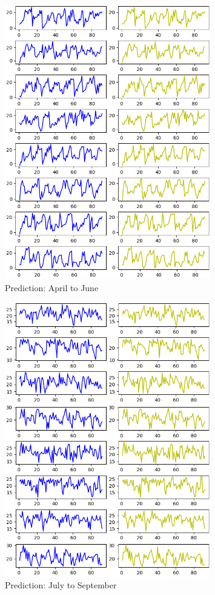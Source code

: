 \documentclass[12pt]{article}
\begin{document}
\begin{figure}[htpb]
	\centering
	\includegraphics[width=0.8\textwidth]{pic/Predicted-and-Tested_2.png}
	\caption{Prediction: April to June}
	\label{Fig:pred-2}
\end{figure}

\begin{figure}[htpb]
	\centering
	\includegraphics[width=0.8\textwidth]{pic/Predicted-and-Tested_3.png}
	\caption{Prediction: July to September}
	\label{Fig:pred-3}
\end{figure}
\end{document}
